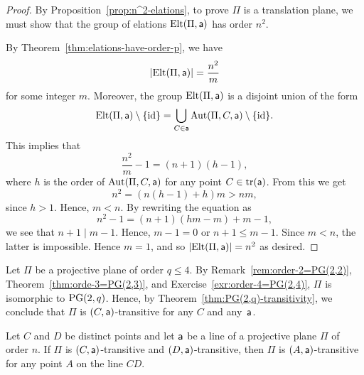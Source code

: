 \begin{proof}
    By Proposition~\ref{prop:n^2-elations}, to prove $\Pi$ is a translation plane, we must show that the group of elations $\mathrm{Elt}(\Pi,\mathsf a)$ has order $n^2$.

    By Theorem~\ref{thm:elations-have-order-p}, we have
    \[
    |\mathrm{Elt}(\Pi,\mathsf a)| = \frac{n^2}m
    \]
    for some integer $m$. Moreover, the group $\mathrm{Elt}(\Pi,\mathsf a)$ is a disjoint union of the form
    \[
    \mathrm{Elt}(\Pi,\mathsf a) \setminus\{\operatorname{id}\} = \bigcup_{C\in\mathsf a}\operatorname{Aut}(\Pi,C,\mathsf a) \setminus\{\operatorname{id}\}.
    \]
    This implies that
    \[
    \frac{n^2}m-1 = (n+1)(h-1),
    \]
    where $h$ is the order of $\operatorname{Aut}(\Pi,C,\mathsf a)$ for any point $C\in\operatorname{tr}(\mathsf a)$. From this we get
    \[
        n^2=(n(h-1)+h)m > nm,
    \]
    since $h>1$. Hence, $m<n$. By rewriting the equation as
    \[
    n^2-1 = (n+1)(hm-m)+m-1,
    \]
    we see that $n+1\mid m-1$. Hence, $m-1=0$ or $n+1\le m-1$. Since $m<n$, the latter is impossible. Hence $m=1$, and so $|\mathrm{Elt}(\Pi,\mathsf a)|=n^2$ as desired.
\end{proof}

\begin{rem}\label{rem:q-le-4}
    Let $\Pi$ be a projective plane of order $q \le 4$. By Remark~\ref{rem:order-2=PG(2,2)}, Theorem~\ref{thm:orde-3=PG(2,3)}, and Exercise~\ref{exr:order-4=PG(2,4)}, $\Pi$ is isomorphic to $\operatorname{PG}(2,q)$. Hence, by Theorem~\ref{thm:PG(2,q)-transitivity}, we conclude that $\Pi$ is $(C,\mathsf{a})$-transitive for any $C$ and any~$\mathsf{a}$.
\end{rem}

\begin{thm}
    Let\/ $C$ and\/ $D$ be distinct points and let\/ $\mathsf{a}$ be a line of a projective plane\/ $\Pi$ of order\/ $n$. If\/ $\Pi$ is\/ $(C, \mathsf{a})$-transitive and\/ $(D, \mathsf{a})$-transitive, then\/ $\Pi$ is\/ $(A, \mathsf{a})$-transitive for any point\/ $A$ on the line\/ $CD$.
\end{thm}

